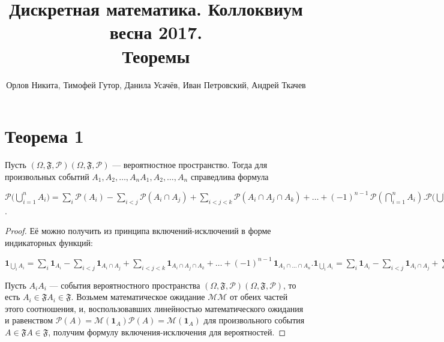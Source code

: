 \documentclass[a4paper,12pt]{article}
\begin{document}
	\title{Дискретная математика. Коллоквиум весна 2017. \\ Теоремы}
	\author{Орлов Никита, Тимофей Гутор, Данила Усачёв, Иван Петровский, Андрей Ткачев}
	\maketitle
	\tableofcontents
    \pagebreak
    \section {Теорема 1}
    \begin{theorem}
   Пусть ${\displaystyle (\Omega ,{\mathfrak {F}},{\mathcal {P}})} (\Omega ,{\mathfrak {F}},{\mathcal {P}})$ — вероятностное пространство. Тогда для произвольных событий ${\displaystyle A_{1},A_{2},\ldots ,A_{n}} A_{1},A_{2},\ldots ,A_{n}$ справедлива формула

${\displaystyle {\mathcal {P}}{\biggl (}\bigcup _{i=1}^{n}A_{i}{\biggr )}=\sum _{i}{\mathcal {P}}(A_{i})-\sum _{i<j}{\mathcal {P}}(A_{i}\cap A_{j})+\sum _{i<j<k}{\mathcal {P}}(A_{i}\cap A_{j}\cap A_{k})+\ldots +(-1)^{n-1}\,{\mathcal {P}}\left(\bigcap _{i=1}^{n}A_{i}\right).} {\mathcal {P}}{\biggl (}\bigcup _{i=1}^{n}A_{i}{\biggr )}=\sum _{i}{\mathcal {P}}(A_{i})-\sum _{i<j}{\mathcal {P}}(A_{i}\cap A_{j})+\sum _{i<j<k}{\mathcal {P}}(A_{i}\cap A_{j}\cap A_{k})+\ldots +(-1)^{n-1}\,{\mathcal {P}}\left(\bigcap _{i=1}^{n}A_{i}\right)$.
    \end{theorem}
    \begin{proof}
    Её можно получить из принципа включений-исключений в форме индикаторных функций:

${\displaystyle \mathbf {1} _{\bigcup _{i}A_{i}}=\sum _{i}\mathbf {1} _{A_{i}}-\sum _{i<j}\mathbf {1} _{A_{i}\cap A_{j}}+\sum _{i<j<k}\mathbf {1} _{A_{i}\cap A_{j}\cap A_{k}}+\ldots +(-1)^{n-1}\,\mathbf {1} _{A_{1}\cap \ldots \cap A_{n}}.} \mathbf {1} _{\bigcup _{i}A_{i}}=\sum _{i}\mathbf {1} _{A_{i}}-\sum _{i<j}\mathbf {1} _{A_{i}\cap A_{j}}+\sum _{i<j<k}\mathbf {1} _{A_{i}\cap A_{j}\cap A_{k}}+\ldots +(-1)^{n-1}\,\mathbf {1} _{A_{1}\cap \ldots \cap A_{n}}.$

Пусть ${\displaystyle A_{i}} A_{i}$ — события вероятностного пространства ${\displaystyle (\Omega ,{\mathfrak {F}},{\mathcal {P}})} (\Omega ,{\mathfrak {F}},{\mathcal {P}})$, то есть ${\displaystyle A_{i}\in {\mathfrak {F}}} A_{i}\in {\mathfrak {F}}$. Возьмем математическое ожидание ${\displaystyle {\mathcal {M}}} {\mathcal {M}}$ от обеих частей этого соотношения, и, воспользовавших линейностью математического ожидания и равенством ${\displaystyle {\mathcal {P}}(A)={\mathcal {M}}(\mathbf {1} _{A})} {\mathcal {P}}(A)={\mathcal {M}}(\mathbf {1} _{A})$ для произвольного события ${\displaystyle A\in {\mathfrak {F}}} {\displaystyle A\in {\mathfrak {F}}}$, получим формулу включения-исключения для вероятностей.
    
    \end{proof}
    
\end{document}
